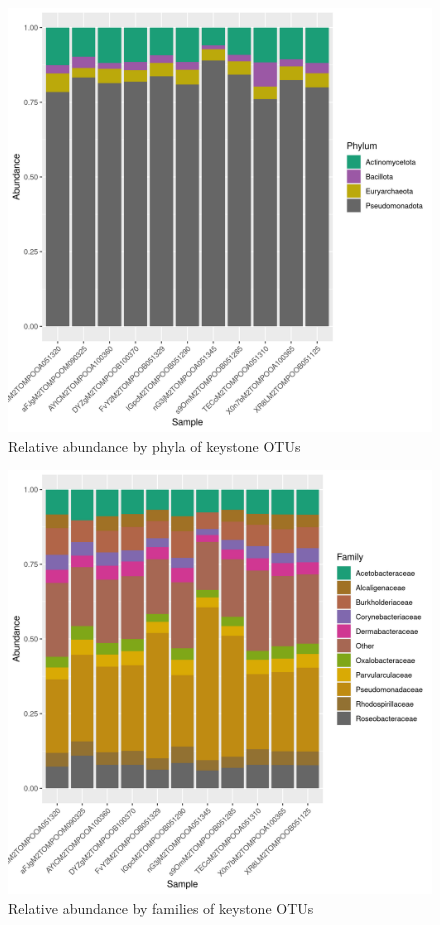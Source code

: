 \begin{figure}
\centering
\includegraphics[scale = 0.8]{tomate_aleatorio1_3.csv_relative_abundance_Phylum.png}
\caption{Relative abundance by phyla of keystone OTUs }
\label{fig:tomate_aleatorio1_3.csv_phyla}
\end{figure}
\begin{figure}
\centering
\includegraphics[scale = 0.8]{tomate_aleatorio1_3.csv_relative_abundance_Family.png}
\caption{Relative abundance by families of keystone OTUs }
\label{fig:tomate_aleatorio1_3.csv_family}
\end{figure}
